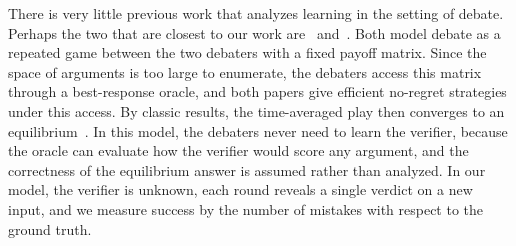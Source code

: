 There is very little previous work that analyzes learning in the
setting of debate. Perhaps the two that are closest to our work
are~\citet{chen2023playing} and~\citet{buzaglo2025hidden}. Both model
debate as a repeated game between the two debaters with a fixed payoff
matrix. Since the space of arguments is too large to enumerate, the
debaters access this matrix through a best-response oracle, and both
papers give efficient no-regret strategies under this access. By
classic results, the time-averaged play then converges to an
equilibrium~\citep{freund1999adaptive,hart2000simple}. In this model,
the debaters never need to learn the verifier, because the oracle can
evaluate how the verifier would score any argument, and the
correctness of the equilibrium answer is assumed rather than analyzed.
In our model, the verifier is unknown, each round reveals a single
verdict on a new input, and we measure success by the number of
mistakes with respect to the ground truth.
